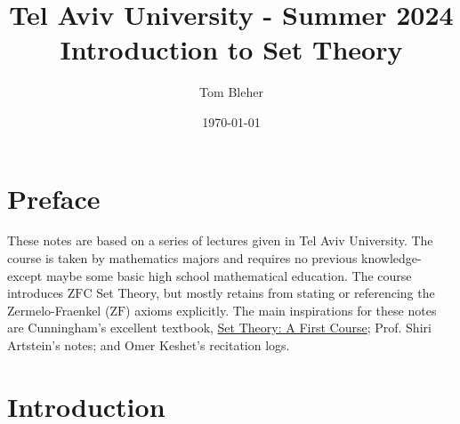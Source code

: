 \documentclass{tufte-handout} %
\title{	
	\normalfont\normalsize 
	{Tel Aviv University - Summer 2024} \\ [0pt] %
	\huge Introduction to Set Theory %
}\author{Tom Bleher} %
\date{\vspace{-5pt}\normalsize\today} %
\theoremstyle{definition}
\theoremstyle{remark}
\begin{document}
\justifying 
\maketitle

\tableofcontents

\section{Preface}
These notes are based on a series of lectures given in Tel Aviv University. The course is taken by mathematics majors and requires no previous knowledge-except maybe some basic high school mathematical education. The course introduces $\mathrm{ZFC}$ Set Theory, but mostly retains from stating or referencing the Zermelo-Fraenkel ($\mathrm{ZF}$) axioms explicitly. The main inspirations for these notes are Cunningham's excellent textbook, \href{https://www.amazon.com/Set-Theory-Cambridge-Mathematical-Textbooks/dp/1107120322}{Set Theory: A First Course}; Prof. Shiri Artstein's notes; and Omer Keshet's recitation logs.
\newpage
\thispagestyle{plain}
\vspace*{\fill}
\begin{center}
\end{center}
\vspace*{\fill}
\newpage
\section{Introduction}
\end{document}
